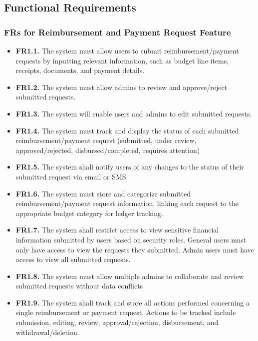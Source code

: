 \documentclass[12pt]{article}
\begin{document}
\subsection{Functional Requirements}

\subsubsection{FRs for Reimbursement and Payment Request Feature}

\begin{itemize}
    \item \textbf{FR1.1.} The system must allow users to submit reimbursement/payment requests by inputting relevant information, such as budget line items, receipts, documents, and payment details.
    \item \textbf{FR1.2.} The system must allow admins to review and approve/reject submitted requests.
    \item \textbf{FR1.3.} The system will enable users and admins to edit submitted requests.
    \item \textbf{FR1.4.} The system must track and display the status of each submitted reimbursement/payment request (submitted, under review, approved/rejected, disbursed/completed, requires attention)
    \item \textbf{FR1.5.} The system shall notify users of any changes to the status of their submitted request via email or SMS.
    \item \textbf{FR1.6.} The system must store and categorize submitted reimbursement/payment request information, linking each request to the appropriate budget category for ledger tracking.
    \item \textbf{FR1.7.} The system shall restrict access to view sensitive financial information submitted by users based on security roles. General users must only have access to view the requests they submitted. Admin users must have access to view all submitted requests.
    \item \textbf{FR1.8.} The system must allow multiple admins to collaborate and review submitted requests without data conflicts
    \item \textbf{FR1.9.} The system shall track and store all actions performed concerning a single reimbursement or payment request. Actions to be tracked include submission, editing, review, approval/rejection, disbursement, and withdrawal/deletion.
\end{itemize}
\end{document}
